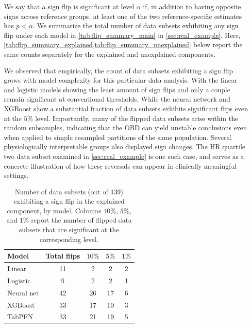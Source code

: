 We say that a sign flip is significant at level $\alpha$ if, in addition to having opposite signs across reference groups, at least one of the two reference-specific estimates has $p < \alpha$. We summarize the total number of data subsets exhibiting any sign flip under each model in \cref{tab:flip_summary_main} in \cref{sec:real_example}. Here, \cref{tab:flip_summary_explained,tab:flip_summary_unexplained} below report the same counts separately for the explained and unexplained components.

We observed that empirically, the count of data subsets exhibiting a sign flip grows with model complexity for this particular data analysis. With the linear and logistic models showing the least amount of sign flips and only a couple remain significant at conventional thresholds. While the neural network and XGBoost show a substantial fraction of data subsets exhibits significant flips even at the $5\%$ level. Importantly, many of the flipped data subsets arise within the random subsamples, indicating that the OBD can yield unstable conclusions even when applied to simple resampled partitions of the same population. Several physiologically interpretable groups also displayed sign changes. The HR quartile two data subset examined in \cref{sec:real_example} is one such case, and serves as a concrete illustration of how these reversals can appear in clinically meaningful settings.

\begin{table}[!ht]
    \caption{Number of data subsets (out of $139$) exhibiting a sign flip in the explained component, by model. Columns $10\%$, $5\%$, and $1\%$ report the number of flipped data subsets that are significant at the corresponding level.}
    \label{tab:flip_summary_explained}
    \centering
    \small
    \begin{tabular}{lcccc}
    \toprule
    Model & Total flips & $10\%$ & $5\%$ & $1\%$ \\
    \midrule
    Linear      & 11 &  2 &  2 &  2 \\
    Logistic    &  9 &  2 &  2 &  1 \\
    Neural net  & 42 & 26 & 17 &  6 \\
    XGBoost     & 33 & 17 & 10 & 3 \\
    TabPFN      & 33 & 21 & 19 & 5 \\
    \bottomrule
    \end{tabular}
\end{table}

